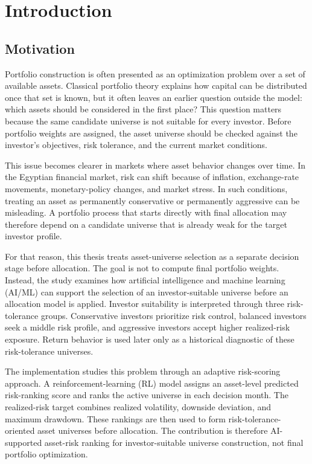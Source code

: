\chapter{Introduction}
\label{chap:intro}

\section{Motivation}

Portfolio construction is often presented as an optimization problem over a set of available assets. Classical portfolio theory explains how capital can be distributed once that set is known, but it often leaves an earlier question outside the model: which assets should be considered in the first place? This question matters because the same candidate universe is not suitable for every investor. Before portfolio weights are assigned, the asset universe should be checked against the investor's objectives, risk tolerance, and the current market conditions.

This issue becomes clearer in markets where asset behavior changes over time. In the Egyptian financial market, risk can shift because of inflation, exchange-rate movements, monetary-policy changes, and market stress. In such conditions, treating an asset as permanently conservative or permanently aggressive can be misleading. A portfolio process that starts directly with final allocation may therefore depend on a candidate universe that is already weak for the target investor profile.

For that reason, this thesis treats asset-universe selection as a separate decision stage before allocation. The goal is not to compute final portfolio weights. Instead, the study examines how artificial intelligence and machine learning (AI/ML) can support the selection of an investor-suitable universe before an allocation model is applied. Investor suitability is interpreted through three risk-tolerance groups. Conservative investors prioritize risk control, balanced investors seek a middle risk profile, and aggressive investors accept higher realized-risk exposure. Return behavior is used later only as a historical diagnostic of these risk-tolerance universes.

The implementation studies this problem through an adaptive risk-scoring approach. A reinforcement-learning (RL) model assigns an asset-level predicted risk-ranking score and ranks the active universe in each decision month. The realized-risk target combines realized volatility, downside deviation, and maximum drawdown. These rankings are then used to form risk-tolerance-oriented asset universes before allocation. The contribution is therefore AI-supported asset-risk ranking for investor-suitable universe construction, not final portfolio optimization.

